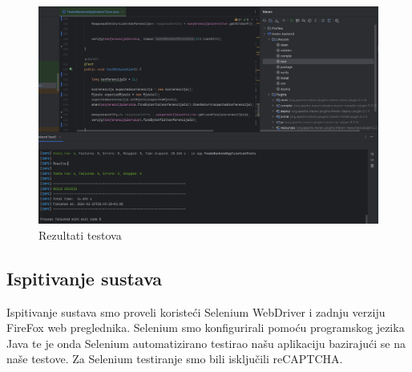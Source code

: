 \begin{packed_enum}
			\begin{figure}[H]
				\includegraphics[width=\textwidth]{slike/JUnitAll.png} %
				\caption{Rezultati testova}
				\label{fig:JUnitAll} %
			\end{figure}
			
				
			\end{packed_enum}
			
			
			
			\subsection{Ispitivanje sustava}
			Ispitivanje sustava smo proveli koristeći Selenium WebDriver i zadnju verziju FireFox web preglednika. Selenium smo konfigurirali pomoću programskog jezika Java te je onda Selenium automatizirano testirao našu aplikaciju bazirajući se na naše testove. Za Selenium testiranje smo bili isključili reCAPTCHA.
	
